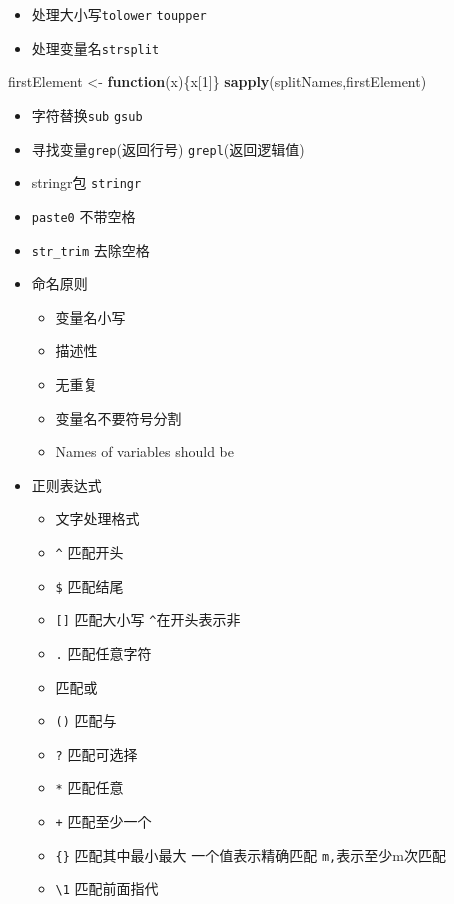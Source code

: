\documentclass[]{book}
\newenvironment{Shaded}{\begin{snugshade}}{\end{snugshade}}
\newcommand{\ControlFlowTok}[1]{\textcolor[rgb]{0.13,0.29,0.53}{\textbf{#1}}}
\newcommand{\DecValTok}[1]{\textcolor[rgb]{0.00,0.00,0.81}{#1}}
\newcommand{\KeywordTok}[1]{\textcolor[rgb]{0.13,0.29,0.53}{\textbf{#1}}}
\newcommand{\NormalTok}[1]{#1}
\newcommand{\StringTok}[1]{\textcolor[rgb]{0.31,0.60,0.02}{#1}}
\providecommand{\tightlist}{%
  \setlength{\itemsep}{0pt}\setlength{\parskip}{0pt}}
\begin{document}
\begin{itemize}
\tightlist
\item
  处理大小写\texttt{tolower} \texttt{toupper}
\item
  处理变量名\texttt{strsplit}
\end{itemize}

\begin{Shaded}
\begin{Highlighting}[]
\NormalTok{firstElement <-}\StringTok{ }\ControlFlowTok{function}\NormalTok{(x)\{x[}\DecValTok{1}\NormalTok{]\}}
\KeywordTok{sapply}\NormalTok{(splitNames,firstElement)}
\end{Highlighting}
\end{Shaded}

\begin{itemize}
\tightlist
\item
  字符替换\texttt{sub} \texttt{gsub}
\item
  寻找变量\texttt{grep}(返回行号) \texttt{grepl}(返回逻辑值)
\item
  stringr包 \texttt{stringr}
\item
  \texttt{paste0} 不带空格
\item
  \texttt{str\_trim} 去除空格
\item
  命名原则

  \begin{itemize}
  \tightlist
  \item
    变量名小写
  \item
    描述性
  \item
    无重复
  \item
    变量名不要符号分割
  \item
    Names of variables should be
  \end{itemize}
\item
  正则表达式

  \begin{itemize}
  \tightlist
  \item
    文字处理格式
  \item
    \texttt{\^{}} 匹配开头
  \item
    \texttt{\$} 匹配结尾
  \item
    \texttt{{[}{]}} 匹配大小写 \texttt{\^{}}在开头表示非
  \item
    \texttt{.} 匹配任意字符
  \item
    \texttt{\textbar{}} 匹配或
  \item
    \texttt{()} 匹配与
  \item
    \texttt{?} 匹配可选择
  \item
    \texttt{*} 匹配任意
  \item
    \texttt{+} 匹配至少一个
  \item
    \texttt{\{\}} 匹配其中最小最大 一个值表示精确匹配 \texttt{m,}表示至少m次匹配
  \item
    \texttt{\textbackslash{}1} 匹配前面指代
  \end{itemize}
\end{itemize}
\end{document}
